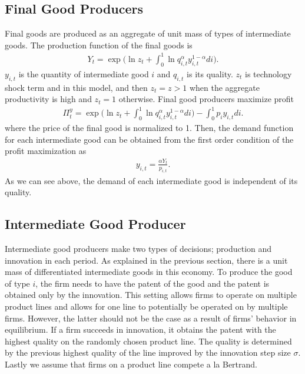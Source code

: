 \documentclass[a4paper,12pt]{article}
\begin{document}
\subsection{Final Good Producers}
Final goods are produced as an aggregate of unit mass of types of intermediate goods. The production function of the final goods is
\begin{align}
    Y_t = \exp \bigg( \ln z_t + \int_0^1 \ln q_{i,t}^\alpha y_{i,t}^{1-\alpha} di\bigg).
\end{align}
$y_{i,t}$ is the quantity of intermediate good $i$ and $q_{i,t}$ is its quality. $z_t$ is technology shock term and in this model, and then $z_t = z >1$ when the aggregate productivity is high and $z_t=1$ otherwise. Final good producers maximize profit 
\begin{align}
    \Pi_t^y = \exp\bigg(\ln z_t+ \int_0^1 \ln q_{i,t}^\alpha y_{i,t}^{1-\alpha} di\bigg) - \int_0^1 p_i y_{i,t} di.
\end{align}
where the price of the final good is normalized to 1. Then, the demand function for each intermediate good can be obtained from the first order condition of the profit maximization as
\begin{align}
    y_{i,t} = \frac{\alpha Y_t}{p_{i,t}}.
\end{align}
As we can see above, the demand of each intermediate good is independent of its quality. 
\subsection{Intermediate Good Producer}
Intermediate good producers make two types of decisions; production and innovation in each period. As explained in the previous section, there is a unit mass of differentiated intermediate goods in this economy. To produce the good of type $i$, the firm needs to have the patent of the good and the patent is obtained only by the innovation. This setting allows firms to operate on multiple product lines and allows for one line to potentially be operated on by multiple firms. However, the latter should not be the case as a result of firms' behavior in equilibrium. If a firm succeeds in innovation, it obtains the patent with the highest quality on the randomly chosen product line. The quality is determined by the previous highest quality of the line improved by the innovation step size $\sigma$. Lastly we assume that firms on a product line compete a la Bertrand. 
\end{document}
